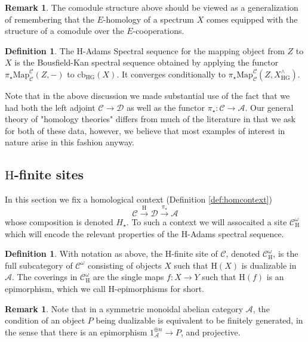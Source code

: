 \documentclass[10pt]{amsart}
\theoremstyle{definition}
\numberwithin{figure}{section}
\numberwithin{equation}{section}
\newtheorem{definition}[figure]{Definition}
\newtheorem{remark}[figure]{Remark}
\newcommand{\cA}{\mathcal{A}}
\newcommand{\cC}{\mathcal{C}}
\newcommand{\cD}{\mathcal{D}}
\newcommand{\one}{\mathrm{1}}
\theoremstyle{cited}
\newcommand{\Map}{\mathrm{Map}}
\newcommand{\cb}{\mathrm{cb}}
\renewcommand{\H}{\mathrm{H}}
\newcommand{\G}{\mathrm{G}}
\begin{document}
\begin{remark}
  The comodule structure above should be viewed as a generalization of remembering that the $E$-homology of a spectrum $X$ comes equipped with the structure of a comodule over the $E$-cooperations.
\end{remark}

\begin{definition}
  The $\H$-Adams Spectral sequence for the mapping object from $Z$ to $X$ is the Bousfield-Kan spectral sequence obtained by applying the functor $\pi_\star\Map_{\cC}^{\cC}(Z, -)$ to $\cb_{\H\G}(X)$. It converges conditionally to $\pi_\star\Map_{\cC}^{\cC}(Z,X^\wedge_{\H\G})$.
\end{definition}

Note that in the above discussion we made substantial use of the fact that we had both the left adjoint $\cC\to \cD$ as well as the functor $\pi_\star:\cC\to \cA$. Our general theory of "homology theories" differs from much of the literature in that we ask for both of these data, however, we believe that most examples of interest in nature arise in this fashion anyway.

\subsection{$\H$-finite sites}

In this section we fix a homological context (Definition \ref{def:homcontext})
\[
\cC\xrightarrow{\H} \cD \xrightarrow{\pi_\star} \cA
\]
whose composition is denoted $H_\star$. To such a context we will assocaited a site $\cC_{\H}^\omega$ which will encode the relevant properties of the $\H$-Adams spectral sequence.

\begin{definition}
  With notation as above, the $\H$-finite site of $\cC$, denoted $\cC^{\omega}_{\H}$, is the full subcategory of $\cC^\omega$ consisting of objects $X$ such that $\H(X)$ is dualizable in $\cA$. The coverings in $\cC^\omega_{\H}$ are the single maps $f:X\to Y$ such that $\H(f)$ is an epimorphism, which we call $\H$-epimorphisms for short.
\end{definition}

\begin{remark}
  Note that in a symmetric monoidal abelian category $\cA$, the condition of an object $P$ being dualizable is equivalent to be finitely generated, in the sense that there is an epimorphism $\one_{\cA}^{\oplus n}\to P$, and projective.
\end{remark}
\end{document}
